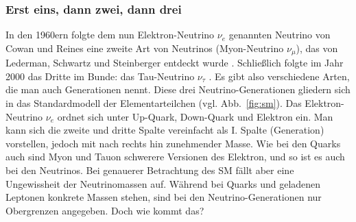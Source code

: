 \documentclass[a4paper,12pt]{article}
\newcommand{\figref}[1]{Abb.~\ref{#1}}
\begin{document}
\subsubsection{Erst eins, dann zwei, dann drei} \label{sssec:221}
In den 1960ern folgte dem nun Elektron-Neutrino $\nu_e$ genannten Neutrino von Cowan und Reines eine zweite Art von Neutrinos (Myon-Neutrino $\nu_\mu$), das von Lederman, Schwartz und Steinberger entdeckt wurde \cite{NPOd}. Schließlich folgte im Jahr 2000 das Dritte im Bunde: das Tau-Neutrino $\nu_\tau$ \cite{Fermilab} \cite[1--2]{DONUT2001}. Es gibt also verschiedene Arten, die man auch Generationen nennt. Diese drei Neutrino-Generationen gliedern sich in das Standardmodell der Elementarteilchen (vgl. \figref{fig:sm}). 
Das Elektron-Neutrino $\nu_e$ ordnet sich unter Up-Quark, Down-Quark und Elektron ein. Man kann sich die zweite und dritte Spalte vereinfacht als \RN{1}. Spalte (Generation) vorstellen, jedoch mit nach rechts hin zunehmender Masse. Wie bei den Quarks auch sind Myon und Tauon schwerere Versionen des Elektron, und so ist es auch bei den Neutrinos. Bei genauerer Betrachtung des SM fällt aber eine Ungewissheit der Neutrinomassen auf. Während bei Quarks und geladenen Leptonen konkrete Massen stehen, sind bei den Neutrino-Generationen nur  Obergrenzen angegeben. Doch wie kommt das? \par
\end{document}
